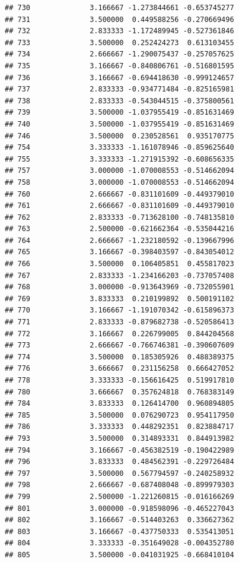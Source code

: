 \documentclass[
]{article}
\begin{document}
\begin{verbatim}
## 730              3.166667 -1.273844661 -0.653745277
## 731              3.500000  0.449588256 -0.270669496
## 732              2.833333 -1.172489945 -0.527361846
## 733              3.500000  0.252424273  0.613103455
## 734              2.666667 -1.290075437 -0.257057625
## 735              3.166667 -0.840806761 -0.516801595
## 736              3.166667 -0.694418630 -0.999124657
## 737              2.833333 -0.934771484 -0.825165981
## 738              2.833333 -0.543044515 -0.375800561
## 739              3.500000 -1.037955419 -0.851631469
## 740              3.500000 -1.037955419 -0.851631469
## 746              3.500000  0.230528561  0.935170775
## 754              3.333333 -1.161078946 -0.859625640
## 755              3.333333 -1.271915392 -0.608656335
## 757              3.000000 -1.070008553 -0.514662094
## 758              3.000000 -1.070008553 -0.514662094
## 760              2.666667 -0.831101609 -0.449379010
## 761              2.666667 -0.831101609 -0.449379010
## 762              2.833333 -0.713628100 -0.748135810
## 763              2.500000 -0.621662364 -0.535044216
## 764              2.666667 -1.232180592 -0.139667996
## 765              3.166667 -0.398403597 -0.843054012
## 766              3.500000  0.106405851  0.455817023
## 767              2.833333 -1.234166203 -0.737057408
## 768              3.000000 -0.913643969 -0.732055901
## 769              3.833333  0.210199892  0.500191102
## 770              3.166667 -1.191070342 -0.615896373
## 771              2.833333 -0.879682738 -0.520586413
## 772              3.166667  0.226799005  0.844204568
## 773              2.666667 -0.766746381 -0.390607609
## 774              3.500000  0.185305926  0.488389375
## 776              3.666667  0.231156258  0.666427052
## 778              3.333333 -0.156616425  0.519917810
## 780              3.666667  0.357624818  0.768383149
## 784              3.833333  0.126414700  0.960894805
## 785              3.500000  0.076290723  0.954117950
## 786              3.333333  0.448292351  0.823884717
## 793              3.500000  0.314893331  0.844913982
## 794              3.166667 -0.456382519 -0.190422989
## 796              3.833333  0.484562391 -0.229726484
## 797              3.500000  0.567794597 -0.240258932
## 798              2.666667 -0.687408048 -0.899979303
## 799              2.500000 -1.221260815 -0.016166269
## 801              3.000000 -0.918598096 -0.465227043
## 802              3.166667 -0.514403263  0.336627362
## 803              3.166667 -0.437750333  0.535413051
## 804              3.333333 -0.351649028 -0.004352780
## 805              3.500000 -0.041031925 -0.668410104

\end{verbatim}
\end{document}

